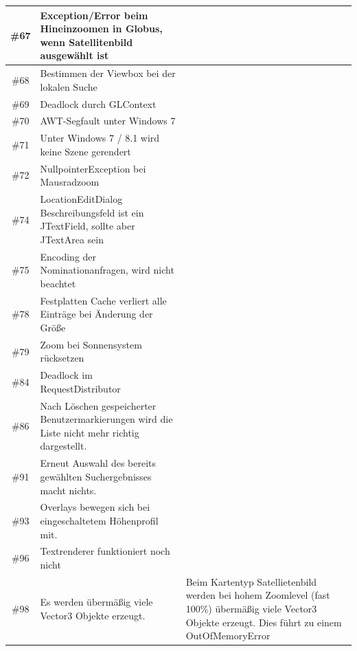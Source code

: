 \documentclass[10pt]{scrreprt}
\begin{document}
\begin{longtable}{|c|p{5.2cm}|p{8.2cm}|}
\hline
\#67 & Exception/Error beim Hineinzoomen in Globus, wenn Satellitenbild ausgewählt ist & \\
\hline
\#68 & Bestimmen der Viewbox bei der lokalen Suche & \\
\hline
\#69 & Deadlock durch GLContext & \\
\hline
\#70 & AWT-Segfault unter Windows 7 & \\
\hline
\#71 & Unter Windows 7 / 8.1 wird keine Szene gerendert & \\
\hline
\#72 & NullpointerException bei Mausradzoom & \\
\hline
\#74 & LocationEditDialog Beschreibungsfeld ist ein JTextField, sollte aber JTextArea sein & \\
\hline
\#75 & Encoding der Nominationanfragen, wird nicht beachtet & \\
\hline
\#78 & Festplatten Cache verliert alle Einträge bei Änderung der Größe & \\
\hline
\#79 & Zoom bei Sonnensystem rücksetzen & \\
\hline
\#84 & Deadlock im RequestDistributor & \\
\hline
\#86 & Nach Löschen gespeicherter Benutzermarkierungen wird die Liste nicht mehr richtig dargestellt. & \\
\hline
\#91 & Erneut Auswahl des bereits gewählten Suchergebnisses macht nichts. & \\
\hline
\#93 & Overlays bewegen sich bei eingeschaltetem Höhenprofil mit. & \\
\hline
\#96 & Textrenderer funktioniert noch nicht & \\
\hline
\#98 & Es werden übermäßig viele Vector3 Objekte erzeugt. & Beim Kartentyp Satellietenbild werden bei hohem Zoomlevel (fast 100\%) übermäßig viele Vector3 Objekte erzeugt. Dies führt zu einem OutOfMemoryError\\
\hline
\end{longtable}

\newpage
\end{document}
